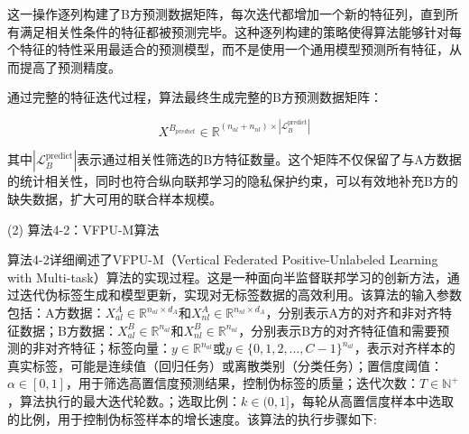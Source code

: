 这一操作逐列构建了B方预测数据矩阵，每次迭代都增加一个新的特征列，直到所有满足相关性条件的特征都被预测完毕。这种逐列构建的策略使得算法能够针对每个特征的特性采用最适合的预测模型，而不是使用一个通用模型预测所有特征，从而提高了预测精度。

通过完整的特征迭代过程，算法最终生成完整的B方预测数据矩阵：

\begin{equation}
	X^{B_{predict}} \in \mathbb{R}^{(n_{al}+n_{nl}) \times |\mathcal{L}_B^{\text{predict}}|}
\end{equation}

其中$|\mathcal{L}_B^{\text{predict}}|$表示通过相关性筛选的B方特征数量。这个矩阵不仅保留了与A方数据的统计相关性，同时也符合纵向联邦学习的隐私保护约束，可以有效地补充B方的缺失数据，扩大可用的联合样本规模。

(2) 算法4-2：VFPU-M算法

算法4-2详细阐述了VFPU-M（Vertical Federated Positive-Unlabeled Learning with Multi-task）算法的实现过程。这是一种面向半监督联邦学习的创新方法，通过迭代伪标签生成和模型更新，实现对无标签数据的高效利用。该算法的输入参数包括：A方数据：$X_{al}^A \in \mathbb{R}^{n_{al} \times d_A}$和$X_{nl}^A \in \mathbb{R}^{n_{nl} \times d_A}$，分别表示A方的对齐和非对齐特征数据；B方数据：$X_{al}^B \in \mathbb{R}^{n_{al}}$和$X_{nl}^B \in \mathbb{R}^{n_{nl}}$，分别表示B方的对齐特征值和需要预测的非对齐特征；标签向量：$y \in \mathbb{R}^{n_{al}}$或$y \in \{0,1,2,...,C-1\}^{n_{al}}$，表示对齐样本的真实标签，可能是连续值（回归任务）或离散类别（分类任务）；置信度阈值：$\alpha \in [0,1]$，用于筛选高置信度预测结果，控制伪标签的质量；迭代次数：$T \in \mathbb{N}^+$，算法执行的最大迭代轮数。；选取比例：$k \in (0,1]$，每轮从高置信度样本中选取的比例，用于控制伪标签样本的增长速度。该算法的执行步骤如下:

